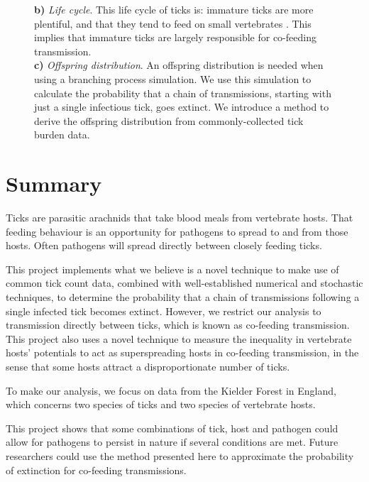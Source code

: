 \documentclass{article}
\begin{document}
\begin{figure}[h!]
\begin{mdframed}[backgroundcolor=grey250,rightline=false,leftline=false,topline=false]
{	    \textbf{b)} \textit{Life cycle}. This life cycle of ticks is: immature ticks are more plentiful, and that they tend to feed on small vertebrates \cite{Randolph1998}. This implies that immature ticks are largely responsible for co-feeding transmission. \\
	    \textbf{c)} \textit{Offspring distribution}. An offspring distribution is needed when using a branching process simulation. We use this simulation to calculate the probability that a chain of transmissions, starting with just a single infectious tick, goes extinct. We introduce a method to derive the offspring distribution from commonly-collected tick burden data.}
	    \label{fig:graphical_abstract}
	\end{mdframed}
\end{figure}

\thispagestyle{empty}
\addtocounter{page}{-1}

\newpage

\section*{Summary}

Ticks are parasitic arachnids that take blood meals from vertebrate hosts. That feeding behaviour is an opportunity for pathogens to spread to and from those hosts. Often pathogens will spread directly between closely feeding ticks.

This project implements what we believe is a novel technique to make use of common tick count data, combined with well-established numerical and stochastic techniques, to determine the probability that a chain of transmissions following a single infected tick becomes extinct. However, we restrict our analysis to transmission directly between ticks, which is known as co-feeding transmission. This project also uses a novel technique to measure the inequality in vertebrate hosts' potentials to act as superspreading hosts in co-feeding transmission, in the sense that some hosts attract a disproportionate number of ticks.

To make our analysis, we focus on data from the Kielder Forest in England, which concerns two species of ticks and two species of vertebrate hosts.

This project shows that some combinations of tick, host and pathogen could allow for pathogens to persist in nature if several conditions are met. Future researchers could use the method presented here to approximate the probability of extinction for co-feeding transmissions.
\end{document}
